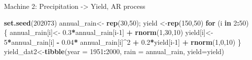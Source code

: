 \documentclass[
  12pt,
  ignorenonframetext,
  aspectratio=169,
]{beamer}
\newenvironment{Shaded}{\begin{snugshade}}{\end{snugshade}}
\newcommand{\ControlFlowTok}[1]{\textcolor[rgb]{0.13,0.29,0.53}{\textbf{#1}}}
\newcommand{\DataTypeTok}[1]{\textcolor[rgb]{0.13,0.29,0.53}{#1}}
\newcommand{\DecValTok}[1]{\textcolor[rgb]{0.00,0.00,0.81}{#1}}
\newcommand{\FloatTok}[1]{\textcolor[rgb]{0.00,0.00,0.81}{#1}}
\newcommand{\KeywordTok}[1]{\textcolor[rgb]{0.13,0.29,0.53}{\textbf{#1}}}
\newcommand{\NormalTok}[1]{#1}
\newcommand{\OperatorTok}[1]{\textcolor[rgb]{0.81,0.36,0.00}{\textbf{#1}}}
\newcommand{\StringTok}[1]{\textcolor[rgb]{0.31,0.60,0.02}{#1}}
\begin{document}
\begin{frame}[fragile]{Machine 2: Precipitation -\textgreater{} Yield,
AR process}
\protect\hypertarget{machine-2-precipitation---yield-ar-process}{}

\begin{Shaded}
\begin{Highlighting}[]
\KeywordTok{set.seed}\NormalTok{(}\DecValTok{202073}\NormalTok{)}
\NormalTok{annual_rain<-}\StringTok{ }\KeywordTok{rep}\NormalTok{(}\DecValTok{30}\NormalTok{,}\DecValTok{50}\NormalTok{); yield <-}\KeywordTok{rep}\NormalTok{(}\DecValTok{150}\NormalTok{,}\DecValTok{50}\NormalTok{)}
\ControlFlowTok{for}\NormalTok{ (i }\ControlFlowTok{in} \DecValTok{2}\OperatorTok{:}\DecValTok{50}\NormalTok{) \{}
\NormalTok{     annual_rain[i]<-}\StringTok{ }\FloatTok{0.3}\OperatorTok{*}\NormalTok{annual_rain[i}\DecValTok{-1}\NormalTok{] }\OperatorTok{+}\StringTok{ }\KeywordTok{rnorm}\NormalTok{(}\DecValTok{1}\NormalTok{,}\DecValTok{30}\NormalTok{,}\DecValTok{10}\NormalTok{)}
\NormalTok{     yield[i]<-}\StringTok{ }\DecValTok{5}\OperatorTok{*}\NormalTok{annual_rain[i] }\OperatorTok{-}\StringTok{ }\FloatTok{0.04}\OperatorTok{*}\StringTok{ }\NormalTok{annual_rain[i]}\OperatorTok{^}\DecValTok{2} \OperatorTok{+}\StringTok{ }
\StringTok{        }\FloatTok{0.2}\OperatorTok{*}\NormalTok{yield[i}\DecValTok{-1}\NormalTok{] }\OperatorTok{+}\StringTok{ }\KeywordTok{rnorm}\NormalTok{(}\DecValTok{1}\NormalTok{,}\DecValTok{0}\NormalTok{,}\DecValTok{10}\NormalTok{)}
\NormalTok{\}}
\NormalTok{yield_dat2<-}\KeywordTok{tibble}\NormalTok{(}\DataTypeTok{year =} \DecValTok{1951}\OperatorTok{:}\DecValTok{2000}\NormalTok{, }\DataTypeTok{rain =}\NormalTok{ annual_rain, }\DataTypeTok{yield=}\NormalTok{yield)}
\end{Highlighting}
\end{Shaded}

\end{frame}
\end{document}
